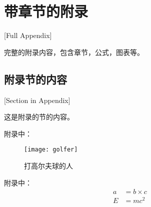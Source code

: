 
\chapter{带章节的附录}[Full Appendix]

完整的附录内容，包含章节，公式，图表等。

\section{附录节的内容}[Section in Appendix]

这是附录的节的内容。

附录中：
\begin{figure}[htbp]
\centering
\texttt{[image: golfer]}
\caption{\xiaosi[0]打高尔夫球的人}
\label{fig:appA}
\end{figure}

附录中：
\begin{align}
a & = b \times c \\
E & = m c^2
\label{eq:appA}
\end{align}
